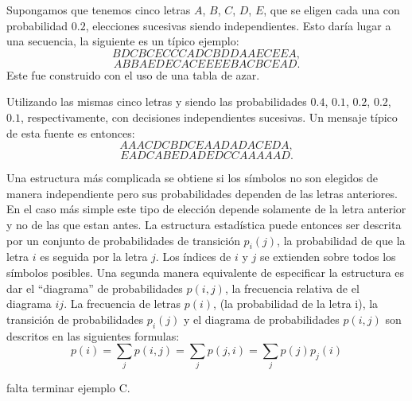 \begin{exmp}
Supongamos que tenemos cinco letras $A$, $B$, $C$, $D$, $E$, que se
eligen cada una con probabilidad $0.2$, elecciones sucesivas siendo
independientes. Esto dar\'ia lugar a una secuencia, la siguiente es un
t\'ipico ejemplo:
$$B D C B C E C C C A D C B D D A A E C E E A,$$
$$A B B A E D E C A C E E E E B A C B C E A D.$$
Este fue construido con el uso de una tabla de azar.
\label{ej:a}
\end{exmp}

\begin{exmp}
Utilizando las mismas cinco letras y siendo las probabilidades $0.4$,
$0.1$, $0.2$, $0.2$, $0.1$, respectivamente, con decisiones independientes
sucesivas. Un mensaje t\'ipico de esta fuente es entonces:
$$A A A C D C B D C E A A D A D A C E D A,$$
$$E A D C A B E D A D E D C C A A A A A D.$$
\label{ej:b}
\end{exmp}

\begin{exmp}
Una estructura m\'as complicada se obtiene si los s\'imbolos no son
elegidos de manera independiente pero sus probabilidades dependen de
las letras anteriores. En el caso m\'as simple este tipo de elecci\'on
depende solamente de la letra anterior y no de las que estan antes. La
estructura estad\'istica puede entonces ser descrita por un conjunto
de probabilidades de transici\'on $p_{i}(j)$, la probabilidad de que
la letra $i$ es seguida por la letra $j$. Los \'indices de $i$ y $j$
se extienden sobre todos los s\'imbolos posibles. Una segunda manera
equivalente de especificar la estructura es dar el ``diagrama'' de
probabilidades $p(i,j)$, la frecuencia relativa de el diagrama $i j$.
La frecuencia de letras $p(i)$, (la probabilidad de la letra i), la
transici\'on de probabilidades $p_{i}(j)$ y el diagrama de
probabilidades $p(i,j)$ son descritos en las siguientes formulas:
\begin{equation}
p(i)=\sum_{j}p(i,j)=\sum_{j}p(j,i)=\sum_{j}p(j)p_{j}(i) 
\end{equation}

falta terminar ejemplo C.
\label{ej:c}
\end{exmp}


